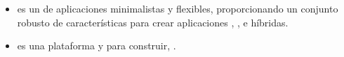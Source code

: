 \begin{itemize}
	\item \textbf{\expressjs} es un \framework de aplicaciones \web \nodejs minimalistas y flexibles, proporcionando un conjunto robusto de características  para crear aplicaciones \web \single, \multipage, e híbridas.
	
	\item \textbf{\docker} es una plataforma \opensource y \sysadmins para construir,  \cite{technology_docker}.
	
\end{itemize}

